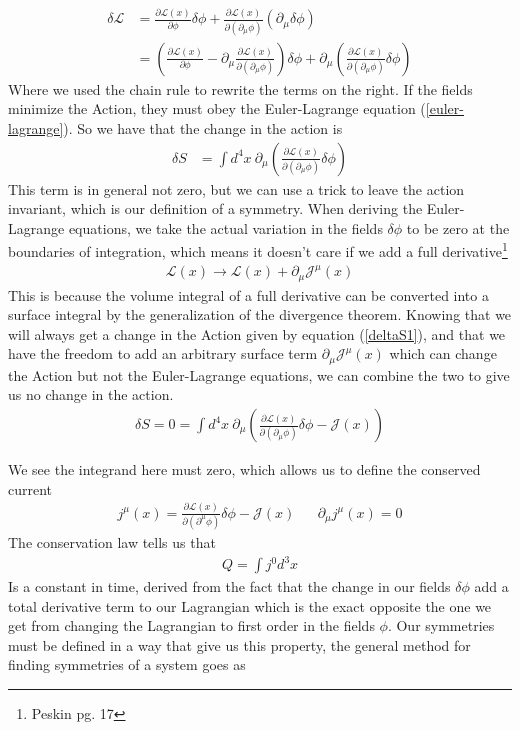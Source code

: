 \begin{align}
    \delta\mathcal{L} &= \frac{\partial\mathcal{L}(x)}{\partial\phi}\delta\phi + \frac{\partial\mathcal{L}(x)}{\partial(\partial_\mu\phi)}(\partial_\mu\delta\phi) \\
    &= \left(\frac{\partial\mathcal{L}(x)}{\partial\phi}- \partial_\mu\frac{\partial\mathcal{L}(x)}{\partial(\partial_\mu\phi)}\right)\delta\phi + \partial_\mu\left(\frac{\partial\mathcal{L}(x)}{\partial(\partial_\mu\phi)}\delta\phi\right)
\end{align}
Where we used the chain rule to rewrite the terms on the right. If the fields minimize the Action, they must obey the Euler-Lagrange equation (\ref{euler-lagrange}). So we have that the change in the action is 
\begin{align}\label{deltaS1}
    \delta S  &= \int d^4x~\partial_\mu\left(\frac{\partial\mathcal{L}(x)}{\partial(\partial_\mu\phi)}\delta\phi\right) 
\end{align}
This term is in general not zero, but we can use a trick to leave the action invariant, which is our definition of a symmetry. When deriving the Euler-Lagrange equations, we take the actual variation in the fields $\delta\phi$ to be zero at the boundaries of integration, which means it doesn't care if we add a full derivative\footnote{Peskin pg. 17}
\begin{align}
\mathcal{L}(x)\rightarrow\mathcal{L}(x) + \partial_\mu\mathcal{J}^\mu(x)
\end{align}
This is because the volume integral of a full derivative can be converted into a surface integral by the generalization of the divergence theorem. 
Knowing that we will always get a change in the Action given by equation (\ref{deltaS1}), and that we have the freedom to add an arbitrary surface term $\partial_\mu\mathcal{J}^\mu(x)$ which can change the Action but not the Euler-Lagrange equations, we can combine the two to give us no change in the action. 
\begin{align}
\delta S = 0 = \int d^4x~\partial_\mu\left(\frac{\partial\mathcal{L}(x)}{\partial(\partial_\mu\phi)}\delta\phi-\mathcal{J}(x)\right) 
\end{align}

We see the integrand here must zero, which allows us to define the conserved current
\begin{align}\label{noether}
j^\mu(x) = \frac{\partial\mathcal{L}(x)}{\partial(\partial^\mu\phi)}\delta\phi-\mathcal{J}(x) &&\partial_\mu j^\mu(x) = 0
\end{align}
The conservation law tells us that 
\begin{align}
Q = \int j^0 d^3x
\end{align}
Is a constant in time, derived from the fact that the change in our fields $\delta\phi$ add a total derivative term to our Lagrangian which is the exact opposite the one we get from changing the Lagrangian to first order in the fields $\phi$. Our symmetries must be defined in a way that give us this property, the general method for finding symmetries of a system goes as 

